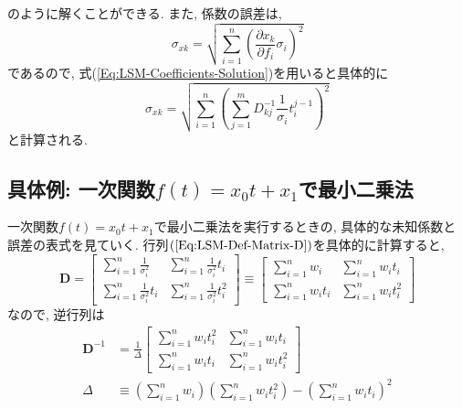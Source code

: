 のように解くことができる. 
また, 係数の誤差は, 
\begin{equation}
    \sigma_{xk}
    =
    \sqrt{
        \sum_{i=1}^{n}
        \left(\frac{\partial x_{k}}{\partial f_{i}} \sigma_{i}\right)^{2}
    }
\end{equation}
であるので, 式(\ref{Eq:LSM-Coefficients-Solution})を用いると具体的に
\begin{equation}
    \sigma_{xk}
    =
    \sqrt{
        \sum_{i=1}^{n}
        \left(
            \sum_{j=1}^{m} D_{kj}^{-1}
            \frac{1}{\sigma_{i}} t_{i}^{j-1}
        \right)^{2}
    }
\end{equation}
と計算される. 

\subsection{具体例: 一次関数$f(t) = x_{0} t + x_{1}$で最小二乗法}
一次関数$f(t) = x_{0} t + x_{1}$で最小二乗法を実行するときの, 具体的な未知係数と誤差の表式を見ていく. 
行列$(\ref{Eq:LSM-Def-Matrix-D})$を具体的に計算すると, 
\begin{equation}
    \bm{D}
    =
    \begin{bmatrix}
        \sum_{i=1}^{n} \frac{1}{\sigma_{i}^{2}} &
        \sum_{i=1}^{n} \frac{1}{\sigma_{i}^{2}} t_{i}
        \\
        \sum_{i=1}^{n} \frac{1}{\sigma_{i}^{2}} t_{i} &
        \sum_{i=1}^{n} \frac{1}{\sigma_{i}^{2}} t_{i}^{2}
    \end{bmatrix}
    \equiv
    \begin{bmatrix}
        \sum_{i=1}^{n} w_{i} &
        \sum_{i=1}^{n} w_{i} t_{i}
        \\
        \sum_{i=1}^{n} w_{i} t_{i} &
        \sum_{i=1}^{n} w_{i} t_{i}^{2}
    \end{bmatrix}
\end{equation}
なので, 逆行列は
\begin{align}
    \bm{D}^{-1}
    &=
    \frac{1}{\Delta}
    \begin{bmatrix}
        \sum_{i=1}^{n} w_{i} t_{i}^2&
        \sum_{i=1}^{n} w_{i} t_{i}
        \\
        \sum_{i=1}^{n} w_{i} t_{i} &
        \sum_{i=1}^{n} w_{i} t_{i}^{2}
    \end{bmatrix}
    \\
    \Delta
    &\equiv
    \left(\sum_{i=1}^{n} w_{i}\right)
    \left(\sum_{i=1}^{n} w_{i} t_{i}^{2}\right)
    -
    \left(\sum_{i=1}^{n} w_{i} t_{i}\right)^{2}
\end{align}

